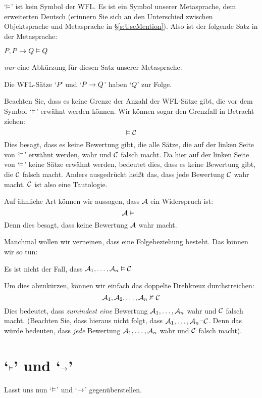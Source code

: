 `$\vDash$' ist kein Symbol der WFL. Es ist ein Symbol unserer Metasprache, dem erweiterten Deutsch (erinnern Sie sich an den Unterschied zwischen Objektsprache und Metasprache in \S\ref{s:UseMention}). Also ist der folgende Satz in der Metasprache:
	\begin{ebullet}
		\item $P, P \rightarrow Q \vDash Q$
	\end{ebullet}
\emph{nur} eine Abkürzung für diesen Satz unserer Metasprache: 
	\begin{ebullet}
		\item Die WFL-Sätze `$P$' und `$P \rightarrow Q$' haben `$Q$' zur Folge.
	\end{ebullet}
Beachten Sie, dass es keine Grenze der Anzahl der WFL-Sätze gibt, die vor dem Symbol `$\vDash$' erwähnt werden können. Wir können sogar den Grenzfall in Betracht ziehen:
	$$\vDash \mathcal{C}$$
Dies besagt, dass es keine Bewertung gibt, die alle Sätze, die auf der linken Seite von `$\vDash$' erwähnt werden, wahr und $\mathcal{C}$ falsch macht. Da hier auf der linken Seite von `$\vDash$' keine Sätze erwähnt werden, bedeutet dies, dass es keine Bewertung gibt, die $\mathcal{C}$ falsch macht. Anders ausgedrückt hei{\ss}t das, dass jede Bewertung $\mathcal{C}$ wahr macht. $\mathcal{C}$ ist also eine Tautologie. 

Auf ähnliche Art können wir aussagen, dass $\mathcal{A}$ ein Widerspruch ist:
	$$\metav{A} \entails\phantom{\metav{C}}$$
Denn dies besagt, dass keine Bewertung $\mathcal{A}$ wahr macht. 
	
Manchmal wollen wir verneinen, dass eine Folgebeziehung besteht. Das können wir so tun: 
\begin{center}
	Es ist nicht der Fall, dass $\mathcal{A}_1, \ldots, \mathcal{A}_n \vDash \mathcal{C}$
\end{center}
Um dies abzukürzen, können wir einfach das doppelte Drehkreuz durchstreichen: 
	$$\mathcal{A}_1, \mathcal{A}_2, \ldots, \mathcal{A}_n \nvDash\mathcal{C}$$
Dies bedeutet, dass \emph{zumindest eine} Bewertung $\mathcal{A}_1, \ldots, \mathcal{A}_n$ wahr und $\mathcal{C}$ falsch macht. (Beachten Sie, dass hieraus nicht folgt, dass $\mathcal{A}_1, \ldots, \mathcal{A}_n \neg \mathcal{C}$. Denn das würde bedeuten, dass \emph{jede} Bewertung $\mathcal{A}_1, \ldots, \mathcal{A}_n$ wahr und $\mathcal{C}$ falsch macht). 

\section{`$\vDash$' und `$\rightarrow$'}
Lasst uns nun `$\vDash$' und `$\rightarrow$' gegenüberstellen. 

